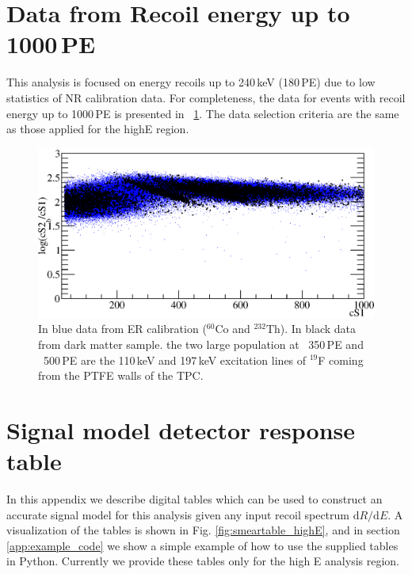 \section{Data from Recoil energy up to 1000\,PE} 
\label{app:1000PE}
This analysis is focused on energy recoils up to 240\,keV (180\,PE) due to low statistics of NR calibration data. For completeness, the data for events with recoil energy up to 1000\,PE is presented in ~\ref{fig:eft_1000}. The data selection criteria are the same as those applied for the highE region.

\begin{figure}
\centerline{\includegraphics[width=1.\linewidth]{Figures/eft_1000.eps}}
\caption{In blue data from ER calibration ($^{60}$Co and $^{232}$Th). In black data from dark matter sample. the two large population at ~350\,PE and ~500\,PE are the 110\,keV and 197\,keV excitation lines of $^{19}$F coming from the PTFE walls of the TPC. }
\label{fig:eft_1000}
\end{figure}  

\section{Signal model detector response table}

In this appendix we describe digital tables which can be used to construct an accurate signal model for this analysis given any input recoil spectrum $\mathrm{d}R/\mathrm{d}E$. A visualization of the tables is shown in Fig. \ref{fig:smeartable_highE}, and in section \ref{app:example_code} we show a simple example of how to use the supplied tables in Python. Currently we provide these tables only for the high E analysis region.


